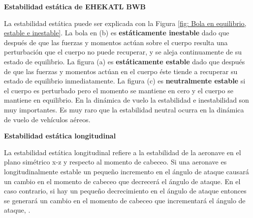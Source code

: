 \medskip
\textbf{Estabilidad estática de EHEKATL BWB}

La estabilidad estática puede ser explicada con la Figura \ref{fig: Bola en equilibrio, estable e inestable}. 
La bola en (b) es \textbf{estáticamente inestable} dado que después de que las fuerzas y momentos actúan sobre el cuerpo resulta una perturbación que el cuerpo no puede recuperar, y se aleja continuamente de su estado de equilibrio. 
La figura (a) es \textbf{estáticamente estable} dado que después de que las fuerzas y momentos actúan en el cuerpo éste tiende a recuperar su estado de equilibrio inmediatamente. 
La figura (c) es \textbf{neutralmente estable} si el cuerpo es perturbado pero el momento se mantiene en cero y el cuerpo se mantiene en equilibrio. 
%
En la dinámica de vuelo la estabilidad e inestabilidad son muy importantes. Es muy raro que la estabilidad neutral ocurra en la dinámica de vuelo de vehículos aéreos. 

\medskip

\textbf{Estabilidad estática longitudinal}

La estabilidad estática longitudinal refiere a la estabilidad de la aeronave en el plano simétrico x-z y respecto al momento de cabeceo.
Si una aeronave es longitudinalmente estable un pequeño incremento en el ángulo de ataque causará un cambio en el momento de cabeceo que decrecerá el ángulo de ataque. En el caso contrario, si hay un pequeño decrecimiento en el ángulo de ataque entonces se generará un cambio en el momento de cabeceo que incrementará el ángulo de ataque, \cite{Neubacher2008}.

